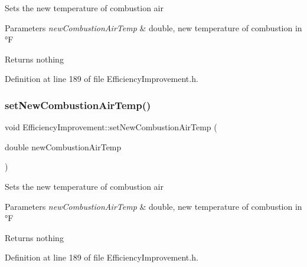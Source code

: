 Sets the new temperature of combustion air


\begin{DoxyParams}{Parameters}
{\em new\+Combustion\+Air\+Temp} & double, new temperature of combustion in °F\\
\hline
\end{DoxyParams}
\begin{DoxyReturn}{Returns}
nothing 
\end{DoxyReturn}


Definition at line 189 of file Efficiency\+Improvement.\+h.

\mbox{\label{class_efficiency_improvement_a93705877dfad913c6282fbd31e66c41a}} 
\subsubsection{\texorpdfstring{set\+New\+Combustion\+Air\+Temp()}{setNewCombustionAirTemp()}\hspace{0.1cm}{\footnotesize\ttfamily [2/3]}}
{\footnotesize\ttfamily void Efficiency\+Improvement\+::set\+New\+Combustion\+Air\+Temp (\begin{DoxyParamCaption}\item[{double}]{new\+Combustion\+Air\+Temp }\end{DoxyParamCaption})\hspace{0.3cm}{\ttfamily [inline]}}

Sets the new temperature of combustion air


\begin{DoxyParams}{Parameters}
{\em new\+Combustion\+Air\+Temp} & double, new temperature of combustion in °F\\
\hline
\end{DoxyParams}
\begin{DoxyReturn}{Returns}
nothing 
\end{DoxyReturn}


Definition at line 189 of file Efficiency\+Improvement.\+h.

\mbox{\label{class_efficiency_improvement_a93705877dfad913c6282fbd31e66c41a}} 
